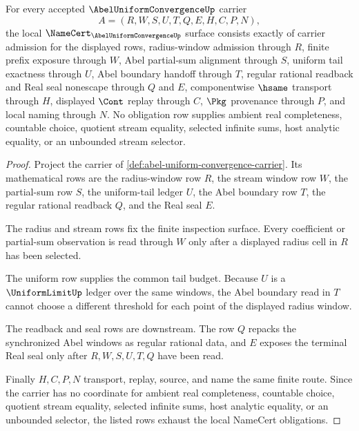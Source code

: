 \begin{theorem}
\label{thm:abel-uniform-convergence-namecert-obligations}
For every accepted $\AbelUniformConvergenceUp$ carrier
$$
A=(R,W,S,U,T,Q,E,H,C,P,N),
$$
the local $\NameCert_{\AbelUniformConvergenceUp}$ surface consists exactly of carrier admission for the displayed rows, radius-window admission through $R$, finite prefix exposure through $W$, Abel partial-sum alignment through $S$, uniform tail exactness through $U$, Abel boundary handoff through $T$, regular rational readback and Real seal nonescape through $Q$ and $E$, componentwise $\hsame$ transport through $H$, displayed $\Cont$ replay through $C$, $\Pkg$ provenance through $P$, and local naming through $N$. No obligation row supplies ambient real completeness, countable choice, quotient stream equality, selected infinite sums, host analytic equality, or an unbounded stream selector.
\end{theorem}
\begin{proof}
Project the carrier of \autoref{def:abel-uniform-convergence-carrier}. Its mathematical rows are the radius-window row $R$, the stream window row $W$, the partial-sum row $S$, the uniform-tail ledger $U$, the Abel boundary row $T$, the regular rational readback $Q$, and the Real seal $E$.

The radius and stream rows fix the finite inspection surface. Every coefficient or partial-sum observation is read through $W$ only after a displayed radius cell in $R$ has been selected.

The uniform row supplies the common tail budget. Because $U$ is a $\UniformLimitUp$ ledger over the same windows, the Abel boundary read in $T$ cannot choose a different threshold for each point of the displayed radius window.

The readback and seal rows are downstream. The row $Q$ repacks the synchronized Abel windows as regular rational data, and $E$ exposes the terminal Real seal only after $R,W,S,U,T,Q$ have been read.

Finally $H,C,P,N$ transport, replay, source, and name the same finite route. Since the carrier has no coordinate for ambient real completeness, countable choice, quotient stream equality, selected infinite sums, host analytic equality, or an unbounded selector, the listed rows exhaust the local NameCert obligations.
\end{proof}

